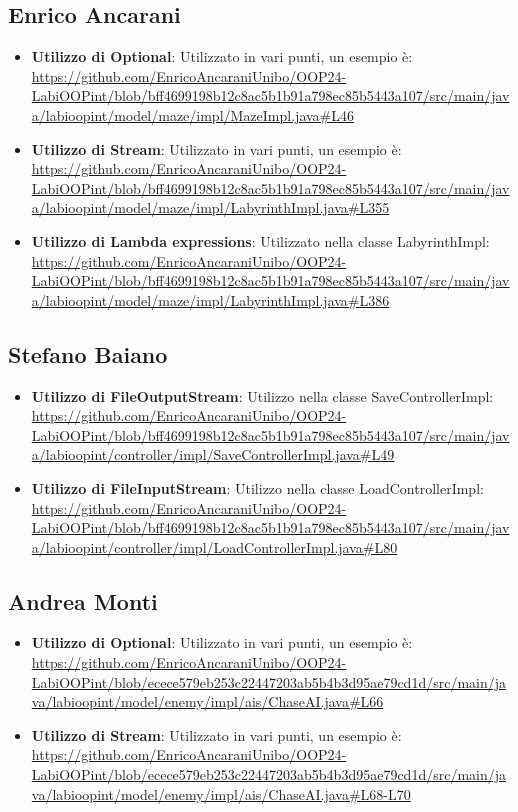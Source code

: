 \documentclass[a4paper,12pt]{report}
\begin{document}
\subsection{Enrico Ancarani}
\begin{itemize}
	\item \textbf{Utilizzo di Optional}: Utilizzato in vari punti, un esempio è: \url{https://github.com/EnricoAncaraniUnibo/OOP24-LabiOOPint/blob/bff4699198b12c8ac5b1b91a798ec85b5443a107/src/main/java/labioopint/model/maze/impl/MazeImpl.java#L46}
	\item \textbf{Utilizzo di Stream}: Utilizzato in vari punti, un esempio è: \url{https://github.com/EnricoAncaraniUnibo/OOP24-LabiOOPint/blob/bff4699198b12c8ac5b1b91a798ec85b5443a107/src/main/java/labioopint/model/maze/impl/LabyrinthImpl.java#L355}
	\item \textbf{Utilizzo di Lambda expressions}: Utilizzato nella classe LabyrinthImpl: \url{https://github.com/EnricoAncaraniUnibo/OOP24-LabiOOPint/blob/bff4699198b12c8ac5b1b91a798ec85b5443a107/src/main/java/labioopint/model/maze/impl/LabyrinthImpl.java#L386}
\end{itemize}

\subsection{Stefano Baiano}
\begin{itemize}
	\item \textbf{Utilizzo di FileOutputStream}: Utilizzo nella classe SaveControllerImpl: \url{https://github.com/EnricoAncaraniUnibo/OOP24-LabiOOPint/blob/bff4699198b12c8ac5b1b91a798ec85b5443a107/src/main/java/labioopint/controller/impl/SaveControllerImpl.java#L49}
	\item \textbf{Utilizzo di FileInputStream}: Utilizzo nella classe LoadControllerImpl: \url{https://github.com/EnricoAncaraniUnibo/OOP24-LabiOOPint/blob/bff4699198b12c8ac5b1b91a798ec85b5443a107/src/main/java/labioopint/controller/impl/LoadControllerImpl.java#L80}
\end{itemize}

\newpage
\subsection{Andrea Monti}
\begin{itemize}
	\item \textbf{Utilizzo di Optional}: Utilizzato in vari punti, un esempio è: \url{https://github.com/EnricoAncaraniUnibo/OOP24-LabiOOPint/blob/ecece579eb253c22447203ab5b4b3d95ae79cd1d/src/main/java/labioopint/model/enemy/impl/ais/ChaseAI.java#L66}
	\item \textbf{Utilizzo di Stream}: Utilizzato in vari punti, un esempio è: \url{https://github.com/EnricoAncaraniUnibo/OOP24-LabiOOPint/blob/ecece579eb253c22447203ab5b4b3d95ae79cd1d/src/main/java/labioopint/model/enemy/impl/ais/ChaseAI.java#L68-L70}
\end{itemize}
\end{document}
